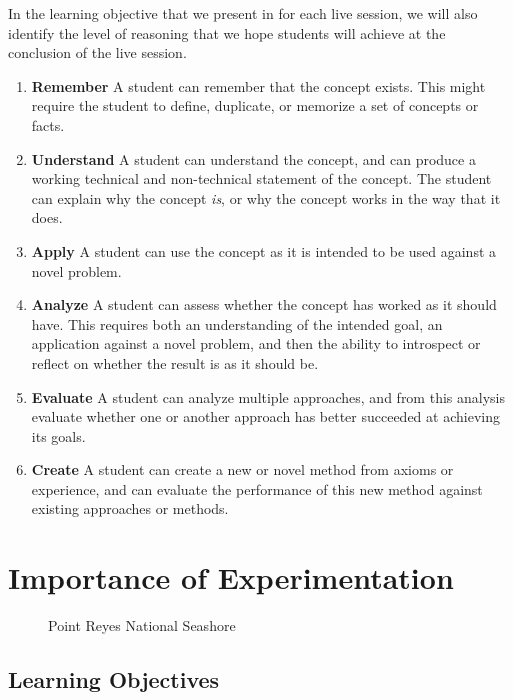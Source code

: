 \documentclass[
]{article}
\makeatletter
\newcommand*\pandocbounded[1]{%
  \sbox\pandoc@box{#1}%
  \Gscale@div\@tempa{\textheight}{\dimexpr\ht\pandoc@box+\dp\pandoc@box\relax}%
  \Gscale@div\@tempb{\linewidth}{\wd\pandoc@box}%
  \ifdim\@tempb\p@<\@tempa\p@\let\@tempa\@tempb\fi%
  \ifdim\@tempa\p@<\p@\scalebox{\@tempa}{\usebox\pandoc@box}%
  \else\usebox{\pandoc@box}%
  \fi%
}
\providecommand{\tightlist}{%
  \setlength{\itemsep}{0pt}\setlength{\parskip}{0pt}}
\theoremstyle{definition}
\theoremstyle{definition}
\theoremstyle{definition}
\theoremstyle{definition}
\theoremstyle{remark}
\makeatother
\begin{document}
In the learning objective that we present in for each live session, we will also identify the level of reasoning that we hope students will achieve at the conclusion of the live session.

\begin{enumerate}
\def\labelenumi{\arabic{enumi}.}
\tightlist
\item
  \textbf{Remember} A student can remember that the concept exists. This might require the student to define, duplicate, or memorize a set of concepts or facts.
\item
  \textbf{Understand} A student can understand the concept, and can produce a working technical and non-technical statement of the concept. The student can explain why the concept \emph{is}, or why the concept works in the way that it does.
\item
  \textbf{Apply} A student can use the concept as it is intended to be used against a novel problem.
\item
  \textbf{Analyze} A student can assess whether the concept has worked as it should have. This requires both an understanding of the intended goal, an application against a novel problem, and then the ability to introspect or reflect on whether the result is as it should be.
\item
  \textbf{Evaluate} A student can analyze multiple approaches, and from this analysis evaluate whether one or another approach has better succeeded at achieving its goals.
\item
  \textbf{Create} A student can create a new or novel method from axioms or experience, and can evaluate the performance of this new method against existing approaches or methods.
\end{enumerate}

\section{Importance of Experimentation}\label{importance-of-experimentation}

\begin{figure}
\centering
\pandocbounded{\texttt{[image: ./images/point\_reyes.jpg]}}
\caption{Point Reyes National Seashore}
\end{figure}

\subsection{Learning Objectives}\label{learning-objectives-1}
\end{document}
